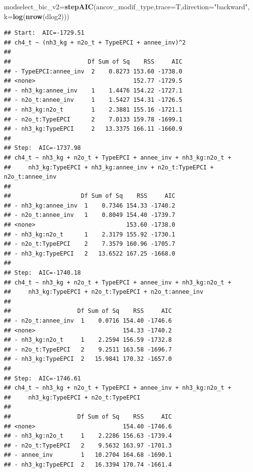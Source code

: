 \documentclass[
]{article}
\newenvironment{Shaded}{\begin{snugshade}}{\end{snugshade}}
\newcommand{\AttributeTok}[1]{\textcolor[rgb]{0.13,0.29,0.53}{#1}}
\newcommand{\FunctionTok}[1]{\textcolor[rgb]{0.13,0.29,0.53}{\textbf{#1}}}
\newcommand{\NormalTok}[1]{#1}
\newcommand{\OtherTok}[1]{\textcolor[rgb]{0.56,0.35,0.01}{#1}}
\newcommand{\StringTok}[1]{\textcolor[rgb]{0.31,0.60,0.02}{#1}}
\begin{document}
\begin{Shaded}
\begin{Highlighting}[]
\NormalTok{modselect\_bic\_v2}\OtherTok{=}\FunctionTok{stepAIC}\NormalTok{(ancov\_modif\_type,}\AttributeTok{trace=}\NormalTok{T,}\AttributeTok{direction=}\StringTok{"backward"}\NormalTok{,}\AttributeTok{k=}\FunctionTok{log}\NormalTok{(}\FunctionTok{nrow}\NormalTok{(dlog2)))}
\end{Highlighting}
\end{Shaded}

\begin{verbatim}
## Start:  AIC=-1729.51
## ch4_t ~ (nh3_kg + n2o_t + TypeEPCI + annee_inv)^2
## 
##                      Df Sum of Sq    RSS     AIC
## - TypeEPCI:annee_inv  2    0.8273 153.60 -1738.0
## <none>                            152.77 -1729.5
## - nh3_kg:annee_inv    1    1.4476 154.22 -1727.1
## - n2o_t:annee_inv     1    1.5427 154.31 -1726.5
## - nh3_kg:n2o_t        1    2.3881 155.16 -1721.1
## - n2o_t:TypeEPCI      2    7.0133 159.78 -1699.1
## - nh3_kg:TypeEPCI     2   13.3375 166.11 -1660.9
## 
## Step:  AIC=-1737.98
## ch4_t ~ nh3_kg + n2o_t + TypeEPCI + annee_inv + nh3_kg:n2o_t + 
##     nh3_kg:TypeEPCI + nh3_kg:annee_inv + n2o_t:TypeEPCI + n2o_t:annee_inv
## 
##                    Df Sum of Sq    RSS     AIC
## - nh3_kg:annee_inv  1    0.7346 154.33 -1740.2
## - n2o_t:annee_inv   1    0.8049 154.40 -1739.7
## <none>                          153.60 -1738.0
## - nh3_kg:n2o_t      1    2.3179 155.92 -1730.1
## - n2o_t:TypeEPCI    2    7.3579 160.96 -1705.7
## - nh3_kg:TypeEPCI   2   13.6522 167.25 -1668.0
## 
## Step:  AIC=-1740.18
## ch4_t ~ nh3_kg + n2o_t + TypeEPCI + annee_inv + nh3_kg:n2o_t + 
##     nh3_kg:TypeEPCI + n2o_t:TypeEPCI + n2o_t:annee_inv
## 
##                   Df Sum of Sq    RSS     AIC
## - n2o_t:annee_inv  1    0.0716 154.40 -1746.6
## <none>                         154.33 -1740.2
## - nh3_kg:n2o_t     1    2.2594 156.59 -1732.8
## - n2o_t:TypeEPCI   2    9.2511 163.58 -1696.7
## - nh3_kg:TypeEPCI  2   15.9841 170.32 -1657.0
## 
## Step:  AIC=-1746.61
## ch4_t ~ nh3_kg + n2o_t + TypeEPCI + annee_inv + nh3_kg:n2o_t + 
##     nh3_kg:TypeEPCI + n2o_t:TypeEPCI
## 
##                   Df Sum of Sq    RSS     AIC
## <none>                         154.40 -1746.6
## - nh3_kg:n2o_t     1    2.2286 156.63 -1739.4
## - n2o_t:TypeEPCI   2    9.5632 163.97 -1701.3
## - annee_inv        1   10.2704 164.68 -1690.1
## - nh3_kg:TypeEPCI  2   16.3394 170.74 -1661.4
\end{verbatim}
\end{document}
